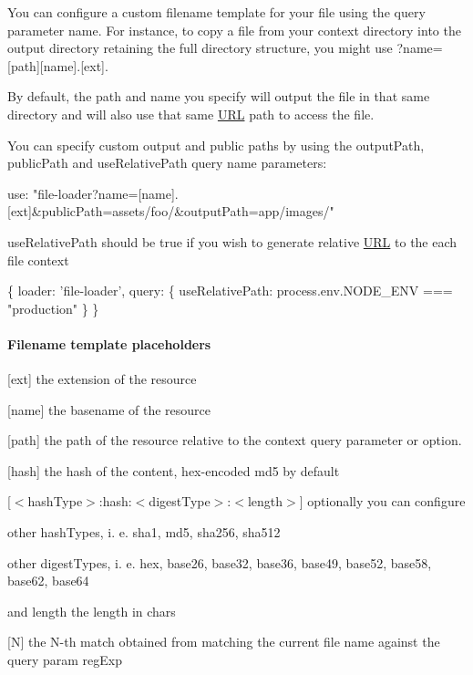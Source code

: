 You can configure a custom filename template for your file using the query parameter {\ttfamily name}. For instance, to copy a file from your {\ttfamily context} directory into the output directory retaining the full directory structure, you might use {\ttfamily ?name=\mbox{[}path\mbox{]}\mbox{[}name\mbox{]}.\mbox{[}ext\mbox{]}}.

By default, the path and name you specify will output the file in that same directory and will also use that same \mbox{\hyperlink{namespace_u_r_l}{U\+RL}} path to access the file.

You can specify custom output and public paths by using the {\ttfamily output\+Path}, {\ttfamily public\+Path} and {\ttfamily use\+Relative\+Path} query name parameters\+:


\begin{DoxyCode}
use: "file-loader?name=[name].[ext]&publicPath=assets/foo/&outputPath=app/images/"
\end{DoxyCode}


{\ttfamily use\+Relative\+Path} should be {\ttfamily true} if you wish to generate relative \mbox{\hyperlink{namespace_u_r_l}{U\+RL}} to the each file context 
\begin{DoxyCode}
\{
 loader: 'file-loader',
 query: \{
  useRelativePath: process.env.NODE\_ENV === "production"
 \}
\}
\end{DoxyCode}


\paragraph*{Filename template placeholders}


\begin{DoxyItemize}
\item {\ttfamily \mbox{[}ext\mbox{]}} the extension of the resource
\item {\ttfamily \mbox{[}name\mbox{]}} the basename of the resource
\item {\ttfamily \mbox{[}path\mbox{]}} the path of the resource relative to the {\ttfamily context} query parameter or option.
\item {\ttfamily \mbox{[}hash\mbox{]}} the hash of the content, {\ttfamily hex}-\/encoded {\ttfamily md5} by default
\item {\ttfamily \mbox{[}$<$hash\+Type$>$\+:hash\+:$<$digest\+Type$>$\+:$<$length$>$\mbox{]}} optionally you can configure
\begin{DoxyItemize}
\item other {\ttfamily hash\+Type}s, i. e. {\ttfamily sha1}, {\ttfamily md5}, {\ttfamily sha256}, {\ttfamily sha512}
\item other {\ttfamily digest\+Type}s, i. e. {\ttfamily hex}, {\ttfamily base26}, {\ttfamily base32}, {\ttfamily base36}, {\ttfamily base49}, {\ttfamily base52}, {\ttfamily base58}, {\ttfamily base62}, {\ttfamily base64}
\item and {\ttfamily length} the length in chars
\end{DoxyItemize}
\item {\ttfamily \mbox{[}N\mbox{]}} the N-\/th match obtained from matching the current file name against the query param {\ttfamily reg\+Exp}
\end{DoxyItemize}

